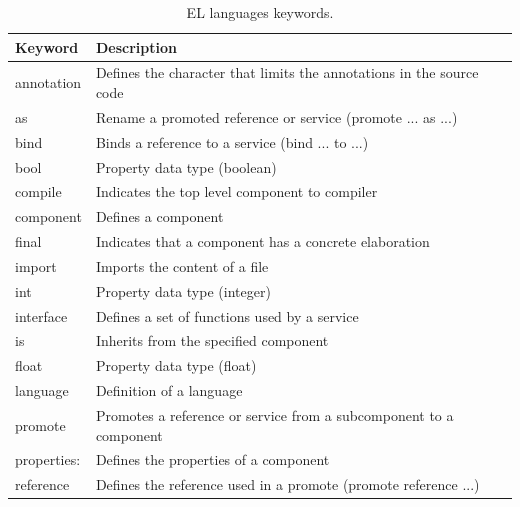 \documentclass{report}
\begin{document}
		
		\begin{table}[H]
			\centering
			\caption{EL languages keywords.}
			\label{tab:keywords}
			\begin{tabular}{l|l}
				\hline 
				\textbf{Keyword} & \textbf{Description} \\
				\hline
				annotation & Defines the character that limits the annotations in the source code \\
				
				as & Rename a promoted reference or service (promote ... as ...)\\
				
				bind & Binds a reference to a service (bind ... to ...)\\
				
				bool & Property data type (boolean)\\
				
				compile & Indicates the top level component to compiler\\
				
				component & Defines a component \\
				
				final & Indicates that a component has a concrete elaboration \\
				
				import & Imports the content of a file \\
				
				int & Property data type (integer) \\
				
				interface & Defines a set of functions used by a service \\
				
				is & Inherits from the specified component \\
				
				float & Property data type (float) \\
				
				language & Definition of a language \\
				
				promote & Promotes a reference or service from a subcomponent to a component \\
				
				properties: & Defines the properties of a component \\
				
				reference & Defines the reference used in a promote (promote reference ...)\\
				

\end{tabular}
\end{table}
\end{document}

